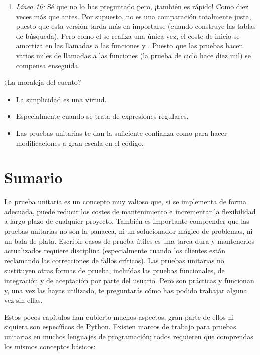 \begin{enumerate}

\item \emph{Línea 16:} Sé que no lo has preguntado pero, ¡también es rápido! Como diez veces más que antes. Por supuesto, no es una comparación totalmente justa, puesto que esta versión tarda más en importarse (cuando construye las tablas de búsqueda). Pero como el  se realiza una única vez, el coste de inicio se amortiza en las llamadas a las funciones  y . Puesto que las pruebas hacen varios miles de llamadas a las funciones (la prueba de ciclo hace diez mil) se compensa enseguida.

\end{enumerate}

¿La moraleja del cuento?

\begin{itemize}

\item La simplicidad es una virtud.

\item Especialmente cuando se trata de expresiones regulares.

\item Las pruebas unitarias te dan la suficiente confianza como para hacer modificaciones a gran escala en el código.

\end{itemize}

\section{Sumario}

La prueba unitaria es un concepto muy valioso que, si se implementa de forma adecuada, puede reducir los costes de mantenimiento e incrementar la flexibilidad a largo plazo de cualquier proyecto. También es importante comprender que las pruebas unitarias no son la panacea, ni un solucionador mágico de problemas, ni un bala de plata. Escribir casos de prueba útiles es una tarea dura y mantenerlos actualizados requiere disciplina (especialmente cuando los clientes están reclamando las correcciones de fallos críticos). Las pruebas unitarias no sustituyen otras formas de prueba, incluídas las pruebas funcionales, de integración y de aceptación por parte del usuario. Pero son prácticas y funcionan y, una vez las hayas utilizado, te preguntarás cómo has podido trabajar alguna vez sin ellas.

Estos pocos capítulos han cubierto muchos aspectos, gran parte de ellos ni siquiera son específicos de Python. Existen marcos de trabajo para pruebas unitarias en muchos lenguajes de programación; todos requieren que comprendas los mismos conceptos básicos:

